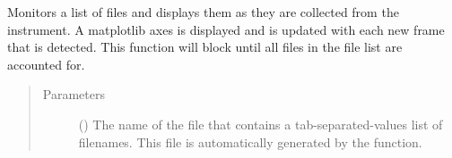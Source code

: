 \documentclass[letterpaper,10pt,english]{sphinxmanual}
\begin{document}
\begin{fulllineitems}
\label{\detokenize{xanespy:xanespy.beamlines.monitor_sector8}}
Monitors a list of files and displays them as they are collected
from the instrument. A matplotlib axes is displayed and is updated
with each new frame that is detected. This function will block
until all files in the file list are accounted for.
\begin{quote}\begin{description}
\item[{Parameters}] \leavevmode
{} () \textendash{} The name of the file that contains a tab-separated-values list
of filenames. This file is automatically generated by the
 function.

\end{description}\end{quote}

\end{fulllineitems}

\end{document}
